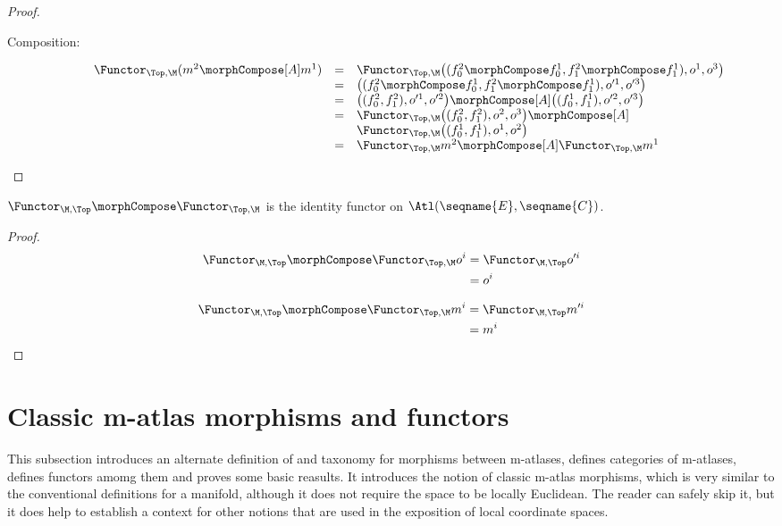\documentclass{article}
\begin{document}
\begin{theorem}
\begin{proof}
\begin{description}
\item[Composition:]
\begin{equation*}
\begin{array}{lll}
  \Functor_{\Top,\M} (m^2 \morphCompose[A] m^1)
  & =
  &
    \Functor_{\Top,\M}
      \bigl (
        (f_0^2 \morphCompose f_0^1, f_1^2 \morphCompose f_1^1),
        o^1,
        o^3
      \bigr )
\\*
  & =
  &
      \bigl (
        (f_0^2 \morphCompose f_0^1, f_1^2 \morphCompose f_1^1),
        o'^1,
        o'^3
      \bigr )
\\*
  & =
  &
      \bigl (
        (f_0^2, f_1^2),
        o'^1,
        o'^2
      \bigr )
      \morphCompose[A]
      \bigl (
        (f_0^1, f_1^1),
        o'^2,
        o'^3
      \bigr )
\\*
  & =
  &
    \Functor_{\Top,\M}
      \bigl (
        (f_0^2, f_1^2),
        o^2,
        o^3
      \bigr )
    \morphCompose[A]
\\*
  &
  &
    \Functor_{\Top,\M}
      \bigl (
        (f_0^1, f_1^1),
        o^1,
        o^2
      \bigr )
\\*
  & =
  &
  \Functor_{\Top,\M} m^2
  \morphCompose[A]
  \Functor_{\Top,\M} m^1
\end{array}
\end{equation*}
\end{description}
\end{proof}

$\Functor_{\M,\Top} \morphCompose \Functor_{\Top,\M}$ is the identity functor
on $\Atl(\seqname{E}, \seqname{C})$.

\begin{proof}
\begin{align*}
  \Functor_{\M,\Top} \morphCompose \Functor_{\Top,\M} o^i
  & =
  \Functor_{\M,\Top} o'^i
\\
  & =
   o^i
\end{align*}

\begin{align*}
  \Functor_{\M,\Top} \morphCompose \Functor_{\Top,\M} m^i
  & =
  \Functor_{\M,\Top} m'^i
\\
  & =
  m^i
\end{align*}

\end{proof}
\end{theorem}

\section{Classic m-atlas morphisms and functors}
\label{sec:M-ATLcmorph}
This subsection introduces an alternate definition of and taxonomy for
morphisms between m-atlases, defines categories of m-atlases, defines
functors amomg them and proves some basic reasults.  It introduces the
notion of classic m-atlas morphisms, which is very similar to
the conventional definitions for a manifold, although it does not
require the space to be locally Euclidean. The reader can safely skip
it, but it does help to establish a context for other notions that are
used in the exposition of local coordinate spaces.
\end{document}

